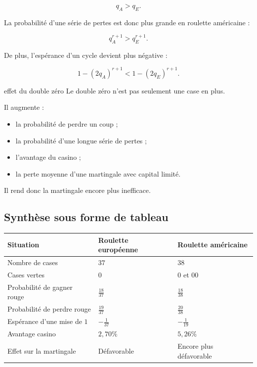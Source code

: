 \documentclass[11pt,a4paper]{article}
\begin{document}
\[
q_A>q_E.
\]

La probabilité d'une série de pertes est donc plus grande en roulette américaine :

\[
q_A^{r+1}>q_E^{r+1}.
\]

De plus, l'espérance d'un cycle devient plus négative :

\[
1-(2q_A)^{r+1}
<
1-(2q_E)^{r+1}.
\]

\begin{conclusionbox}{effet du double zéro}
Le double zéro n'est pas seulement une case en plus.

Il augmente :
\begin{itemize}
    \item la probabilité de perdre un coup ;
    \item la probabilité d'une longue série de pertes ;
    \item l'avantage du casino ;
    \item la perte moyenne d'une martingale avec capital limité.
\end{itemize}

Il rend donc la martingale encore plus inefficace.
\end{conclusionbox}

\subsection{Synthèse sous forme de tableau}

\begin{center}
\renewcommand{\arraystretch}{1.5}
\begin{tabular}{p{4cm}p{4cm}p{4cm}}
\toprule
\textbf{Situation} & \textbf{Roulette européenne} & \textbf{Roulette américaine} \\
\midrule
Nombre de cases & \(37\) & \(38\) \\
Cases vertes & \(0\) & \(0\) et \(00\) \\
Probabilité de gagner rouge & \(\frac{18}{37}\) & \(\frac{18}{38}\) \\
Probabilité de perdre rouge & \(\frac{19}{37}\) & \(\frac{20}{38}\) \\
Espérance d'une mise de \(1\) & \(-\frac{1}{37}\) & \(-\frac{1}{19}\) \\
Avantage casino & \(2{,}70\%\) & \(5{,}26\%\) \\
Effet sur la martingale & Défavorable & Encore plus défavorable \\
\bottomrule
\end{tabular}
\end{center}
\end{document}
